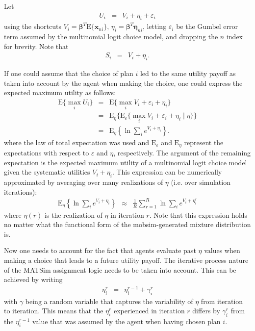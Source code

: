 Let
\begin{eqnarray}
U_{i} & = & V_{i}+\eta_{i}+\varepsilon_{i}\label{eq:full-random-utility-without-time}
\end{eqnarray}
using the shortcuts $V_{i}=\boldsymbol{\beta}^{T}\text{E}\{\mathbf{x}_{ni}\}$,
$\eta_{i}=\boldsymbol{\beta}^{T}\boldsymbol{\eta}_{ni}$, letting
$\varepsilon_{i}$ be the Gumbel error term assumed by the multinomial
logit choice model, and dropping the $n$ index for brevity. Note
that
\begin{eqnarray}
S_{i} & = & V_{i}+\eta_{i}.\label{eq:score}
\end{eqnarray}

If one could assume that the choice of plan $i$ led to the same utility
payoff as taken into account by the agent when making the choice,
one could express the expected maximum utility as follows:
\begin{eqnarray}
\text{E}\{\max_{i}U_{i}\} & = & \text{E}\{\max_{i}V_{i}+\varepsilon_{i}+\eta_{i}\}\\
 & = & \text{E}_{\eta}\{\text{E}_{\varepsilon}\{\max_{i}V_{i}+\varepsilon_{i}+\eta_{i}\mid\eta\}\}\\
 & = & \text{E}_{\eta}\left\{ \ln\sum_{i}e^{V_{i}+\eta_{i}}\right\} .
\end{eqnarray}
where the law of total expectation was used and $\text{E}_{\varepsilon}$
and $\text{E}_{\eta}$ represent the expectations with respect to
$\varepsilon$ and $\eta$, respectively. The argument of the remaining
expectation is the expected maximum utility of a multinomial logit
choice model given the systematic utilities $V_{i}+\eta_{i}$. This
expression can be numerically approximated by averaging over many
realizations of $\eta$ (i.e. over simulation iterations):
\begin{eqnarray}
\text{E}_{\eta}\left\{ \ln\sum_{i}e^{V_{i}+\eta_{i}}\right\}  & \approx & 
\frac{1}{R}\sum_{r=1}^{R}\ln\sum_{i}e^{V_{i}+\eta_{i}^{r}}\label{eq:wartezimmer}
\end{eqnarray}
where $\eta(r)$ is the realization of $\eta$ in iteration $r$.
Note that this expression holds no matter what the functional form
of the mobsim-generated mixture distribution is.

Now one needs to account for the fact that agents evaluate past $\eta$
values when making a choice that leads to a future utility payoff.
The iterative process nature of the MATSim assignment logic needs
to be taken into account. This can be achieved by writing
\begin{eqnarray}
\eta_{i}^{r} & = & \eta_{i}^{r-1}+\gamma_{i}^{r}\label{eq:score-random-walk}
\end{eqnarray}
with $\gamma$ being a random variable that captures the
variability of $\eta$ from iteration to iteration. This means that
the $\eta_{i}^{r}$ experienced in iteration $r$ differs by $\gamma_{i}^{r}$
from the $\eta_{i}^{r-1}$ value that was assumed by the agent when
having chosen plan $i$. 

